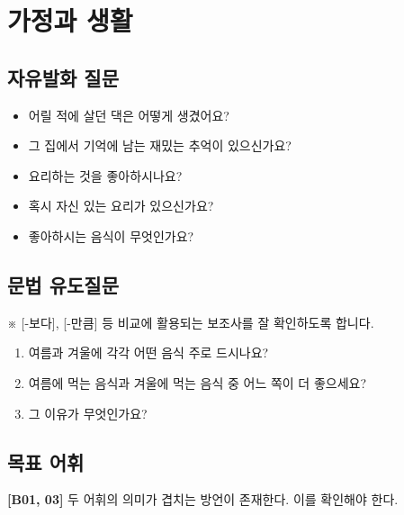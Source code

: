 \section{가정과 생활}

\subsection{자유발화 질문}
\begin{itemize}[noitemsep]
  \item 어릴 적에 살던 댁은 어떻게 생겼어요?
  \item 그 집에서 기억에 남는 재밌는 추억이 있으신가요?
  \item 요리하는 것을 좋아하시나요?
  \item 혹시 자신 있는 요리가 있으신가요?
  \item 좋아하시는 음식이 무엇인가요?
\end{itemize}

\subsection{문법 유도질문}
※ [-보다], [-만큼] 등 비교에 활용되는 보조사를 잘 확인하도록 합니다.

\begin{enumerate}[noitemsep]
  \item 여름과 겨울에 각각 어떤 음식 주로 드시나요?
  \item 여름에 먹는 음식과 겨울에 먹는 음식 중 어느 쪽이 더 좋으세요?
  \item 그 이유가 무엇인가요?
\end{enumerate}

\subsection{목표 어휘}
%

\textbf{[B01, 03]} 두 어휘의 의미가 겹치는 방언이 존재한다. 이를 확인해야 한다. \\


